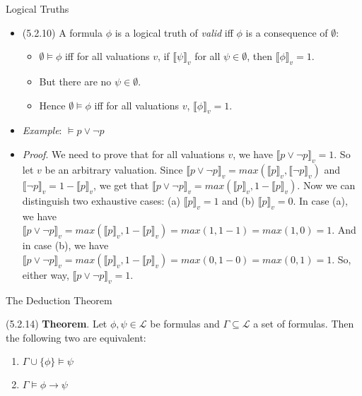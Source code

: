 \begin{frame}{Logical Truths}

	\begin{itemize}
	
		\item (5.2.10) A formula $\phi$ is a logical truth of \emph{valid} iff $\phi$ is a consequence of $\emptyset$:
		
		\begin{itemize}
		
			\item $\emptyset\vDash\phi$ iff for all valuations $v$, if $\llbracket\psi\rrbracket_v$ for all $\psi\in\emptyset$, then $\llbracket\phi\rrbracket_v=1$. 
			
			\item But there are no $\psi\in\emptyset$.
			
			\item Hence $\emptyset\vDash\phi$ iff for all valuations $v$, $\llbracket\phi\rrbracket_v=1$. 

		\end{itemize}
		
		\item \emph{Example}: $\vDash p\lor\neg p$
		
		\item[] \emph{Proof}. We need to prove that for all valuations $v$, we have  $\llbracket p\lor\neg p\rrbracket_v=1$. So let $v$ be an arbitrary valuation. Since $\llbracket p\lor\neg p\rrbracket_v=max(\llbracket p\rrbracket_v,\llbracket\neg p\rrbracket_v)$ and $\llbracket \neg p\rrbracket_v=1-\llbracket p\rrbracket_v$, we get that $\llbracket p\lor\neg p\rrbracket_v=max(\llbracket p\rrbracket_v,1-\llbracket p\rrbracket_v)$. Now we can distinguish two exhaustive cases: (a) $\llbracket p\rrbracket_v=1$ and (b) $\llbracket p\rrbracket_v=0$. In case (a), we have $\llbracket p\lor\neg p\rrbracket_v=max(\llbracket p\rrbracket_v,1-\llbracket p\rrbracket_v)=max(1,1-1)=max(1,0)=1$. And in case (b), we have $\llbracket p\lor\neg p\rrbracket_v=max(\llbracket p\rrbracket_v,1-\llbracket p\rrbracket_v)=max(0, 1-0)=max(0,1)=1$. So, either way, $\llbracket p\lor\neg p\rrbracket_v=1$.	
	\end{itemize}

\end{frame}

\begin{frame}{The Deduction Theorem}

(5.2.14) \textbf{Theorem}. Let $\phi,\psi\in\mathcal{L}$ be formulas and $\Gamma\subseteq\mathcal{L}$ a set of formulas. Then the following two are equivalent:
			\begin{enumerate}[1.]
			
				\item $\Gamma\cup\{\phi\}\vDash\psi$
				
				\item $\Gamma\vDash \phi\to\psi$
			
			\end{enumerate}



\end{frame}

